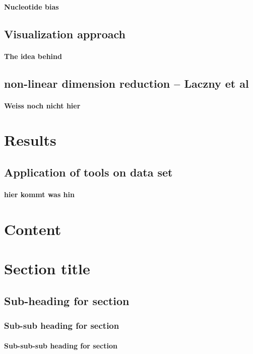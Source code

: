 \documentclass[twocolumn]{bmcart}%
\begin{document}
\paragraph*{Nucleotide bias}
\subsection*{Visualization approach}
\paragraph*{The idea behind}
\subsection*{non-linear dimension reduction -- Laczny et al}
\paragraph*{Weiss noch nicht hier}
\section*{Results}
\subsection*{Application of tools on data set}
\paragraph*{hier kommt was hin}

\section*{Content}
\section*{Section title}
\subsection*{Sub-heading for section}
\subsubsection*{Sub-sub heading for section}
\paragraph*{Sub-sub-sub heading for section}
\end{document}
